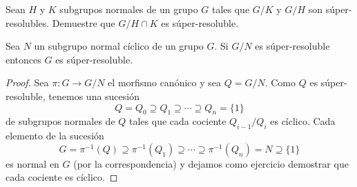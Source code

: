 
\begin{exercise}
	Sean $H$ y $K$ subgrupos normales de un grupo $G$ tales que $G/K$ y $G/H$
	son súper-resolubles. Demuestre que $G/H\cap K$ es súper-resoluble.
\end{exercise}


\begin{proposition}
	\label{proposition:Nciclico}
	Sea $N$ un subgrupo normal cíclico de un grupo $G$. Si $G/N$ es
	súper-resoluble entonces $G$ es súper-resoluble.
\end{proposition}


\begin{proof}
	Sea $\pi\colon G\to G/N$ el morfismo canónico y sea $Q=G/N$. Como $Q$ es
	súper-resoluble, tenemos una sucesión
	\[
		Q=Q_0\supseteq Q_1\supseteq \cdots\supseteq Q_n=\{1\}
	\]
	de subgrupos normales de $Q$ tales que cada cociente $Q_{i-1}/Q_i$ es
	cíclico. Cada elemento de la sucesión
	\[
	G=\pi^{-1}(Q)\supseteq\pi^{-1}(Q_1)\supseteq\cdots\supseteq \pi^{-1}(Q_n)=N\supseteq \{1\}
	\]
	es normal en $G$ (por la correspondencia) y dejamos como 
	ejercicio demostrar que cada cociente es cíclico. 
\end{proof}

